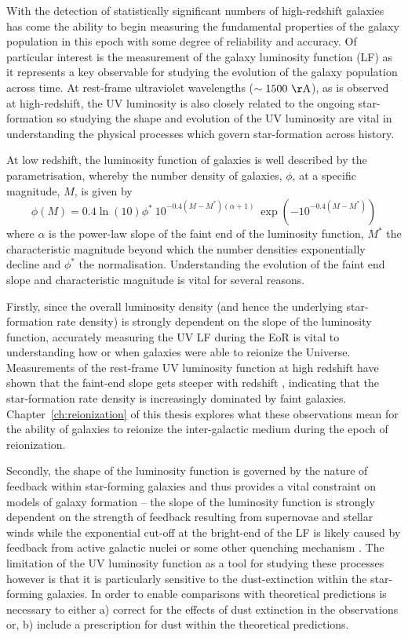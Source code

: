With the detection of statistically significant numbers of high-redshift galaxies has come the ability to begin measuring the fundamental properties of the galaxy population in this epoch with some degree of reliability and accuracy. Of particular interest is the measurement of the galaxy luminosity function (LF) as it represents a key observable for studying the evolution of the galaxy population across time. At rest-frame ultraviolet wavelengths ($\sim1500~\rm{\AA}$), as is observed at high-redshift, the UV luminosity is also closely related to the ongoing star-formation so studying the shape and evolution of the UV luminosity are vital in understanding the physical processes which govern star-formation across history.

At low redshift, the luminosity function of galaxies is well described by the \citet{Schechter:1976gl} parametrisation, whereby the number density of galaxies, $\phi$, at a specific magnitude, $M$, is given by
\begin{equation}
	\phi(M) = 0.4 \ln(10) \phi^{*} ~ 10^{-0.4(M-M^{*})(\alpha+1)} ~ \exp(-10^{-0.4(M-M^{*})})	
\end{equation}
where $\alpha$ is the power-law slope of the faint end of the luminosity function, $M^{*}$ the characteristic magnitude beyond which the number densities exponentially decline and $\phi^{*}$ the normalisation. Understanding the evolution of the faint end slope and characteristic magnitude is vital for several reasons.

Firstly, since the overall luminosity density (and hence the underlying star-formation rate density) is strongly dependent on the slope of the luminosity function, accurately measuring the UV LF during the EoR is vital to understanding how or when galaxies were able to reionize the Universe. Measurements of the rest-frame UV luminosity function at high redshift have shown that the faint-end slope gets steeper with redshift \citep{2007ApJ...670..928B,Bouwens:2014tx,Finkelstein:2014ub}, indicating that the star-formation rate density is increasingly dominated by faint galaxies. Chapter~\ref{ch:reionization} of this thesis explores what these observations mean for the ability of galaxies to reionize the inter-galactic medium during the epoch of reionization.

Secondly, the shape of the luminosity function is governed by the nature of feedback within star-forming galaxies and thus provides a vital constraint on models of galaxy formation \citep{2006MNRAS.370..645B} -- the slope of the luminosity function is strongly dependent on the strength of feedback resulting from supernovae and stellar winds while the exponential cut-off at the bright-end of the LF is likely caused by feedback from active galactic nuclei or some other quenching mechanism \citep{Benson:2003ch,Peng:2010gn}. The limitation of the UV luminosity function as a tool for studying these processes however is that it is particularly sensitive to the dust-extinction within the star-forming galaxies. In order to enable comparisons with theoretical predictions is necessary to either a) correct for the effects of dust extinction in the observations or, b) include a prescription for dust within the theoretical predictions.

